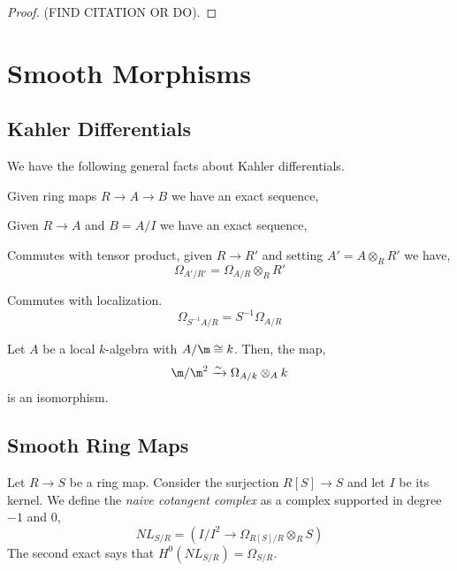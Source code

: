 \documentclass[12pt]{article}
\begin{document}
\begin{proof}
(FIND CITATION OR DO).
\end{proof}



\section{Smooth Morphisms}

\subsection{Kahler Differentials}

\begin{prop}
We have the following general facts about Kahler differentials.
\item  Given ring maps $R \to A \to B$ we have an exact sequence,
\begin{center}
\end{center}
\item Given $R \to A$ and $B = A / I$ we have an exact sequence,
\begin{center}
\end{center}
\item Commutes with tensor product, given $R \to R'$ and setting $A' = A \otimes_R R'$ we have,
\[ \Omega_{A'/R'} = \Omega_{A/R} \otimes_R R' \]
\item Commutes with localization.
\[ \Omega_{S^{-1} A/R} = S^{-1} \Omega_{A/R} \]
\end{prop}

\begin{prop}
Let $A$ be a local $k$-algebra with $A/\m \cong k$. Then, the map,
\[ \m / \m^2 \xrightarrow{\sim} \Omega_{A/k} \otimes_A k \]
is an isomorphism.
\end{prop}

\subsection{Smooth Ring Maps}

\begin{defn}
Let $R \to S$ be a ring map. Consider the surjection $R[S] \to S$ and let $I$ be its kernel. We define the \textit{naive cotangent complex} as a complex supported in degree $-1$ and $0$,
\[ NL_{S/R} = \left( I/I^2 \to \Omega_{R[S]/R}  \otimes_R S \right) \]
The second exact says that $H^0(NL_{S/R}) = \Omega_{S/R}$. 
\end{defn}
\end{document}
